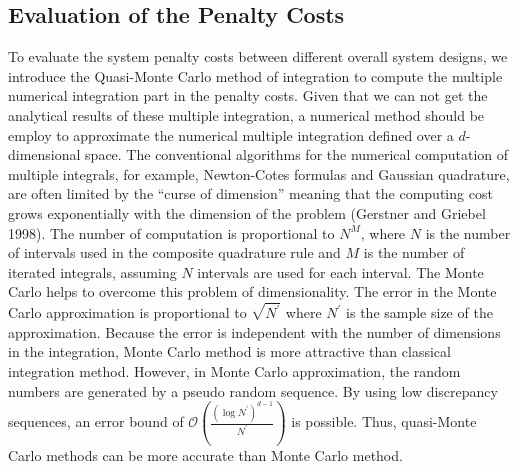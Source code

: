 \documentclass[10pt,a4paper]{article}
\begin{document}
\subsection{Evaluation of the Penalty Costs}
To evaluate the system penalty costs between different overall system designs, we introduce the Quasi-Monte Carlo method of integration to compute the multiple numerical integration part in the penalty costs. Given that we can not get the analytical results of these multiple integration, a numerical method should be employ to approximate the numerical multiple integration defined over a $d$-dimensional space. The conventional algorithms for the numerical computation of multiple integrals, for example, Newton-Cotes formulas and Gaussian quadrature, are often limited by the ``curse of dimension'' meaning that the computing cost grows exponentially with the dimension of the problem (Gerstner and Griebel 1998). The number of computation is proportional to $N^{M}$, where $N$ is the number of intervals used in the composite quadrature rule and $M$ is the number of iterated integrals, assuming $N$ intervals are used for each interval. The Monte Carlo helps to overcome this problem of dimensionality. The error in the Monte Carlo approximation is proportional to $\sqrt{N^{'}}$ where $N^{'}$ is the sample size of the approximation. Because the error is independent with the number of dimensions in the integration, Monte Carlo method is more attractive than classical integration method. However, in Monte Carlo approximation, the random numbers are generated by a pseudo random sequence. By using low discrepancy sequences, an error bound of $\mathcal{O}(\frac{(\log N^{'})^{d-1}}{N^{'}})$ is possible. Thus, quasi-Monte Carlo methods can be more accurate than Monte Carlo method.
\end{document}
